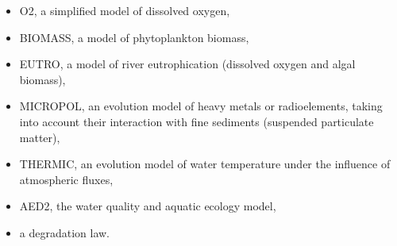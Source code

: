 \documentclass[Waqtel]{../../data/TelemacDoc} %
\begin{document}
\begin{itemize}
\item O2, a simplified model of dissolved oxygen,
\item BIOMASS, a model of phytoplankton biomass,
\item EUTRO, a model of river eutrophication (dissolved oxygen and algal biomass),
\item MICROPOL, an evolution model of heavy metals or radioelements,
  taking into account their interaction with fine sediments (suspended particulate matter),
\item THERMIC, an evolution model of water temperature under the influence of atmospheric fluxes,
\item AED2, the water quality and aquatic ecology model,
\item a degradation law.
\end{itemize}






%

\end{document}
